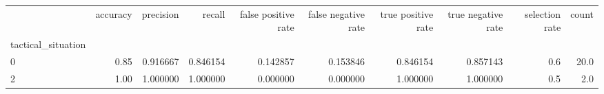 \begin{tabular}{lrrrrrrrrr}
\toprule
{} &  accuracy &  precision &    recall &  false positive rate &  false negative rate &  true positive rate &  true negative rate &  selection rate &  count \\
tactical\_situation &           &            &           &                      &                      &                     &                     &                 &        \\
\midrule
0                  &      0.85 &   0.916667 &  0.846154 &             0.142857 &             0.153846 &            0.846154 &            0.857143 &             0.6 &   20.0 \\
2                  &      1.00 &   1.000000 &  1.000000 &             0.000000 &             0.000000 &            1.000000 &            1.000000 &             0.5 &    2.0 \\
\bottomrule
\end{tabular}
